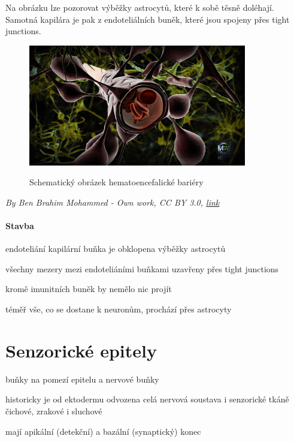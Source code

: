 \documentclass[DIV=8]{scrreprt}
\begin{document}
Na obrázku lze pozorovat výběžky astrocytů, které k sobě těsně doléhají. Samotná kapilára je pak z endoteliálních buněk, které jsou spojeny přes tight junctions.

\begin{figure}
    \caption{Schematický obrázek hematoencefalické bariéry}
    \includegraphics[width=0.85\textwidth]{bbb.jpg}
    \centering
    \label{}
\end{figure}

\emph{By Ben Brahim Mohammed - Own work, CC BY 3.0, \href{https://commons.wikimedia.org/w/index.php?curid=12263975}{link}}

\paragraph{Stavba}
\begin{myItemize}[nosep]
    \item endoteliání kapilární buňka je obklopena výběžky astrocytů
    \item všechny mezery mezi endoteliáními buňkami uzavřeny přes tight junctions
    \item kromě imunitních buněk by nemělo nic projít
    \item téměř vše, co se dostane k neuronům, prochází přes astrocyty
\end{myItemize}



\section{Senzorické epitely} \label{Senzorické epitely} \FloatBarrier


\begin{myItemize}[nosep]
    \item buňky na pomezí epitelu a nervové buňky
\begin{myItemize}[nosep]
    \item historicky je od ektodermu odvozena celá nervová soustava i senzorické tkáně čichové, zrakové i sluchové
\end{myItemize}

    \item mají apikální (detekční) a bazální (synaptický) konec
\end{myItemize}
\end{document}
